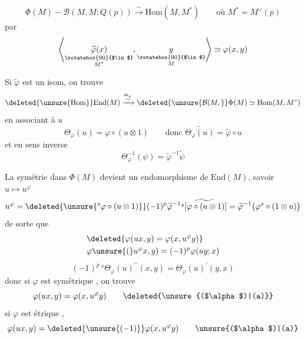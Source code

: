 \[
\Phi(M)-\mathcal B(M,M;Q(p))\xrightarrow{\sim}\mathrm{Hom}(M,M^*)\qquad\text{où }M^*=M^\vee(p)
\]
par
\[
\left\langle\underset{\substack{\rotatebox{90}{$\in$}\\ M^*}}{\widetilde\varphi(x)},\underset{\substack{\rotatebox{90}{$\in$}\\ M}}{y}\right\rangle\simeq\varphi(x,y)
\]

Si $\widetilde\varphi$ est un isom, on trouve
\[
\deleted{\unsure{\mathrm{Hom}}}\mathrm{End}(M)\xrightarrow{\overset{\Theta_\varphi}{\sim}}\deleted{\unsure{\mathcal B(M,}}\Phi(M)\simeq\mathrm{Hom}(M,M^*)
\]
en associant à $u$
\[
\Theta_\varphi(u)=\varphi\circ(u\otimes1)\qquad\text{donc }\widetilde{\Theta_\varphi(u)}=\widetilde\varphi\circ u
\]
et en sens inverse
\[
\Theta_\varphi^{-1}(\psi)=\widetilde\varphi^{-1}\widetilde\psi
\]

La symétrie  dans $\Phi(M)$ devient un
endomorphisme de $\mathrm{End}(M)$,  savoir $u\mapsto u^\varphi$
\[
u^\varphi=\deleted{\unsure{{}^s\varphi\circ(u\otimes1)}}(-1)^p\widetilde\varphi^{-1}\widetilde{{}^s[\varphi\circ(u\otimes1)]}=\widetilde\varphi^{-1}\bigl(\varphi^s\circ(1\otimes u)\bigr)
\]
de sorte que
\[
\begin{aligned}
&\deleted{\varphi(ux,y)=\varphi(x,u^\varphi y)}\\
&\varphi\unsure{(}u^\varphi x,y)=(-1)^p\varphi(uy;x)
\end{aligned}
\]
\[
(-1)^p\,{}^s\Theta_\varphi(u)^{\prime\prime}(x,y)=\Theta_\varphi(u)^{\prime}(y,x)
\]
donc si $\varphi$ est symétrique , on trouve
\[
\varphi(ux,y)=\varphi(x,u^\varphi y)\tag*{\deleted{\unsure{($\alpha$)|(a)}}}
\]
si $\varphi$ est  étrique  , 
\[
\varphi(ux,y)=\deleted{\unsure{(-1)}}\varphi(x,u^\varphi y)\tag*{\unsure{($\alpha$)|(a)}}
\]
